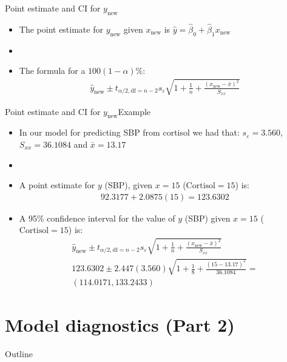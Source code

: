 \documentclass[xcolor=dvipsnames]{beamer}
\begin{document}
\begin{frame}{Point estimate and CI for $y_{\text{new}}$}
	\begin{itemize}
		\item The point estimate for $y_{\text{new}}$ given $x_{\text{new}}$ is $\hat{y}=\hat{\beta}_0 + \hat{\beta}_1 x_{\text{new}}$
		\item[]
		\item The formula for a $100(1-\alpha)\%$: 
		\begin{gather*}
			\hat{y}_{\text{new}} \pm t_{\alpha / 2, \text{df} = n-2}s_{\varepsilon}\sqrt{1+\frac{1}{n} + \frac{(x_{\text{new}}-\bar{x})^2}{S_{xx}}}
		\end{gather*}
	\end{itemize}
\end{frame}

\begin{frame}{Point estimate and CI for $y_{\text{new}}$}{Example}
\begin{itemize}
		\item In our model for predicting SBP from cortisol we had that: $s_{\varepsilon} = 3.560$, $S_{xx} = 36.1084$ and $\bar{x}=13.17$
\item[]
\item A point estimate for $y$ (SBP), given $x=15$ ($\text{Cortisol}=15$) is:
\begin{gather*}
92.3177 + 2.0875(15) = 123.6302
\end{gather*}
\item A 95\% confidence interval for the value of $y$ (SBP) given $x=15$ ($\text{Cortisol}=15$) is:
	\begin{gather*}
	\hat{y}_{\text{new}} \pm t_{\alpha / 2, \text{df} = n-2}s_{\varepsilon}\sqrt{1+\frac{1}{n} + \frac{(x_{\text{new}}-\bar{x})^2}{S_{xx}}} \\
	123.6302 \pm 2.447 (3.560)\sqrt{1+ \frac{1}{8} + \frac{(15-13.17)^2}{36.1084}} = \\
	(114.0171, 133.2433)
	\end{gather*}
\end{itemize}
\end{frame}

\section{Model diagnostics (Part 2)}
\begin{frame}{Outline}
\tableofcontents[currentsection,subsectionstyle=show/shaded/hide]
\end{frame}
\end{document}
